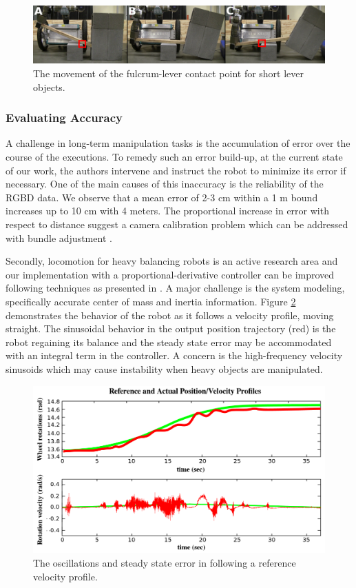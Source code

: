 \documentclass[runningheads,a4paper]{llncs}
\begin{document}
\begin{figure}[ht!] 
  \centering
  \includegraphics[width=1.0\linewidth]{Figures/short.png}
  \caption{The movement of the fulcrum-lever contact point for short lever objects.}
  \label{fig:short}
\end{figure}

\subsubsection{Evaluating Accuracy}

A challenge in long-term manipulation tasks is the accumulation of error over the course of the
executions. To remedy such an error build-up, at the current state of our work, the authors
intervene and instruct the robot to minimize its error if necessary. One of the main causes of this
inaccuracy is the reliability of the RGBD data. We observe that a mean error of 2-3 cm within a 1 m
bound increases up to 10 cm with 4 meters. The proportional increase in error with respect to
distance suggest a camera calibration problem which can be addressed with bundle adjustment \cite{pradeep2014calibrating}. 
 
Secondly, locomotion for heavy balancing robots is an active research area and our implementation
with a proportional-derivative controller can be improved following techniques as presented in
\cite{ha1996trajectory}. A major challenge is the system modeling, specifically accurate center of
mass and inertia information. Figure \ref{fig:controller} demonstrates the behavior of the robot as
it follows a velocity profile, moving straight. The sinusoidal behavior in the output position
trajectory (red) is the robot regaining its balance and the steady state error may be accommodated
with an integral term in the controller. A concern is the high-frequency velocity sinusoids which may cause instability when heavy objects are manipulated.

\begin{figure}[ht!] 
  \centering
  \includegraphics[width=0.9\linewidth]{Figures/controller.png}
  \caption{The oscillations and steady state error in following a reference velocity profile.}
  \label{fig:controller}
\end{figure}
\end{document}
